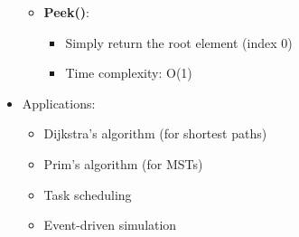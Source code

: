 \documentclass[11pt,a4paper]{article}
\begin{document}
\begin{multicols}{2}
\begin{itemize}
\begin{itemize}
\begin{itemize}
        \end{itemize}
        \item \textbf{Peek()}:
        \begin{itemize}
            \item Simply return the root element (index 0)
            \item Time complexity: O(1)
        \end{itemize}
    \end{itemize}
    \item Applications:
    \begin{itemize}
        \item Dijkstra's algorithm (for shortest paths)
        \item Prim's algorithm (for MSTs)
        \item Task scheduling
        \item Event-driven simulation
    \end{itemize}
\end{itemize}


\end{multicols}
\end{document}
